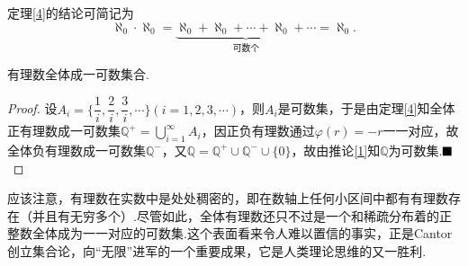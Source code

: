 定理\ref{4}的结论可简记为
$$\aleph_0\cdot \aleph_0=\underbrace{\aleph_0+\aleph_0+\cdots+\aleph_0+\cdots}_{\text{可数个}}=\aleph_0.$$
\begin{theorem}
	有理数全体成一可数集合.
\end{theorem}
\begin{proof}
	设$A_i=\biggl\{\dfrac{1}{i},\dfrac{2}{i},\dfrac{3}{i},\cdots\biggr\}(i=1,2,3,\cdots)$，则$A_i$是可数集，于是由定理\ref{4}知全体正有理数成一可数集$\mathbb{Q}^+=\bigcup\limits_{i=1}^{\infty}A_i$，因正负有理数通过$\varphi(r)=-r$一一对应，故全体负有理数成一可数集$\mathbb{Q}^-$，又$\mathbb{Q}=\mathbb{Q}^+\cup\mathbb{Q}^-\cup \{0\}$，故由推论\ref{1}知$\mathbb{Q}$为可数集.$\hfill\blacksquare$
\end{proof}

应该注意，有理数在实数中是处处稠密的，即在数轴上任何小区间中都有有理数存在（并且有无穷多个）.尽管如此，全体有理数还只不过是一个和稀疏分布着的正整数全体成为一一对应的可数集.这个表面看来令人难以置信的事实，正是Cantor创立集合论，向“无限”进军的一个重要成果，它是人类理论思维的又一胜利.

